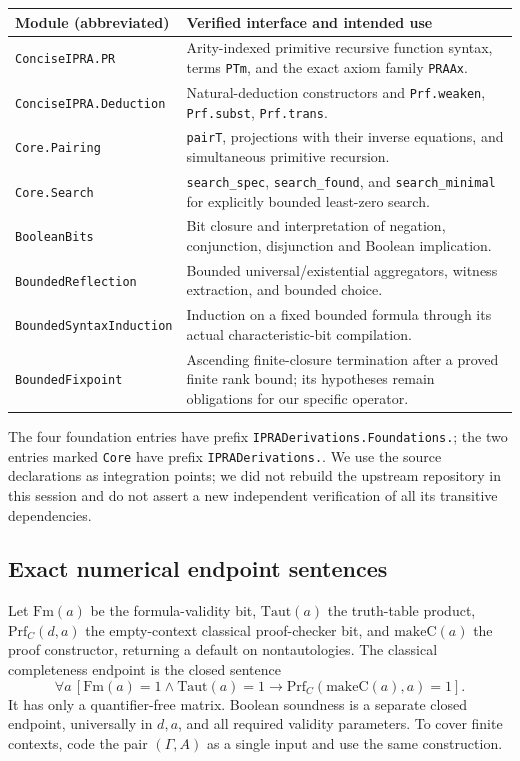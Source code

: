 \begin{center}\small
\begin{tabularx}{\textwidth}{@{}>{\raggedright\arraybackslash}p{}>{\raggedright\arraybackslash}X@{}}
\toprule
Module (abbreviated) & Verified interface and intended use\\
\midrule
\texttt{ConciseIPRA.PR} & Arity-indexed primitive recursive function syntax,
terms \texttt{PTm}, and the exact axiom family \texttt{PRAAx}.\\
\texttt{ConciseIPRA.Deduction} & Natural-deduction constructors and
\texttt{Prf.weaken}, \texttt{Prf.subst}, \texttt{Prf.trans}.\\
\texttt{Core.Pairing} & \texttt{pairT}, projections with their inverse
equations, and simultaneous primitive recursion.\\
\texttt{Core.Search} & \texttt{search\_spec},
\texttt{search\_found}, and \texttt{search\_minimal} for explicitly
bounded least-zero search.\\
\texttt{BooleanBits} & Bit closure and interpretation of negation,
conjunction, disjunction and Boolean implication.\\
\texttt{BoundedReflection} & Bounded universal/existential aggregators,
witness extraction, and bounded choice.\\
\texttt{BoundedSyntaxInduction} & Induction on a fixed bounded formula
through its actual characteristic-bit compilation.\\
\texttt{BoundedFixpoint} & Ascending finite-closure termination after
a proved finite rank bound; its hypotheses remain obligations for our
specific operator.\\
\bottomrule
\end{tabularx}\end{center}

The four foundation entries have prefix
\texttt{IPRADerivations.Foundations.}; the two entries marked
\texttt{Core} have prefix \texttt{IPRADerivations.}.
We use the source declarations as integration points; we did not rebuild
the upstream repository in this session and do not assert a new independent
verification of all its transitive dependencies.

\subsection{Exact numerical endpoint sentences}

Let $\mathrm{Fm}(a)$ be the formula-validity bit,
$\mathrm{Taut}(a)$ the truth-table product, $\mathrm{Prf}_C(d,a)$ the
empty-context classical proof-checker bit, and $\mathrm{makeC}(a)$ the
proof constructor, returning a default on nontautologies. The classical
completeness endpoint is the closed sentence
\[
 \forall a\,[\mathrm{Fm}(a)=1\wedge\mathrm{Taut}(a)=1
                   \to\mathrm{Prf}_C(\mathrm{makeC}(a),a)=1].
\]
It has only a quantifier-free matrix. Boolean soundness is a separate
closed endpoint, universally in $d,a$, and all required validity parameters.
To cover finite contexts, code the pair $(\Gamma,A)$ as a single input and
use the same construction.

